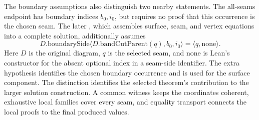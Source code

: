The boundary assumptions also distinguish two nearby statements. The
all-seams endpoint has boundary indices $b_0,i_0$, but requires no proof
that this occurrence is the chosen seam. The later
, which assembles surface, seam, and vertex
equations into a complete solution, additionally assumes
\[
  D.\mathrm{boundarySide}
  \langle D.\mathrm{bandCutParent}(q),b_0,i_0\rangle
  =\langle q,\mathrm{none}\rangle.
\]
Here $D$ is the original diagram, $q$ is the selected seam, and
$\mathrm{none}$ is Lean's constructor for the absent optional index
in a seam-side identifier. The extra hypothesis identifies the chosen
boundary occurrence and is used for the surface component. The distinction identifies the selected theorem's contribution to the larger solution construction. A common witness keeps the coordinates coherent, exhaustive local families cover every seam, and equality transport connects the local proofs to the final produced values.
